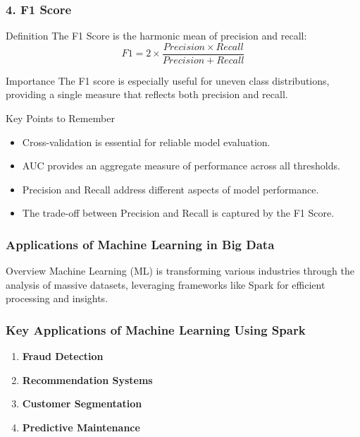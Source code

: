 \documentclass[aspectratio=169]{beamer}
\begin{document}
\begin{frame}[fragile]
    \frametitle{4. F1 Score}
    \begin{block}{Definition}
        The F1 Score is the harmonic mean of precision and recall:
        \begin{equation}
        F1 = 2 \times \frac{Precision \times Recall}{Precision + Recall}
        \end{equation}
    \end{block}

    \begin{block}{Importance}
        The F1 score is especially useful for uneven class distributions, providing a single measure that reflects both precision and recall.
    \end{block}

    \begin{block}{Key Points to Remember}
        \begin{itemize}
            \item Cross-validation is essential for reliable model evaluation.
            \item AUC provides an aggregate measure of performance across all thresholds.
            \item Precision and Recall address different aspects of model performance.
            \item The trade-off between Precision and Recall is captured by the F1 Score.
        \end{itemize}
    \end{block}
\end{frame}

\begin{frame}
    \frametitle{Applications of Machine Learning in Big Data}
    \begin{block}{Overview}
        Machine Learning (ML) is transforming various industries through the analysis of massive datasets, leveraging frameworks like Spark for efficient processing and insights.
    \end{block}
\end{frame}

\begin{frame}
    \frametitle{Key Applications of Machine Learning Using Spark}
    \begin{enumerate}
        \item \textbf{Fraud Detection}
        \item \textbf{Recommendation Systems}
        \item \textbf{Customer Segmentation}
        \item \textbf{Predictive Maintenance}
    \end{enumerate}
\end{frame}
\end{document}
